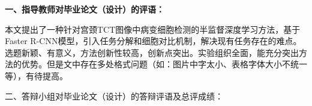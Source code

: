 \cleardoublepage{}

{
    \bfseries
    \noindent 一、指导教师对毕业论文（设计）的评语：\\
    \par 本文提出了一种针对宫颈TCT图像中病变细胞检测的半监督深度学习方法，基于Faster R-CNN模型，引入任务分解和细胞对比机制，解决现有任务存在的难点。选题新颖、有意义，方法创新性较高，创新点突出。实验组织全面，能充分突出方法的优势。但是文中存在多处格式问题（如：图片中字太小、表格字体大小不统一等），有待提高。

    \signature{指导教师（签名）}

    \noindent 二、答辩小组对毕业论文（设计）的答辩评语及总评成绩：\\

    \mbox{} \vfill

    \finaleval[][][][][]

    \signature{负责人（签名）}
}
